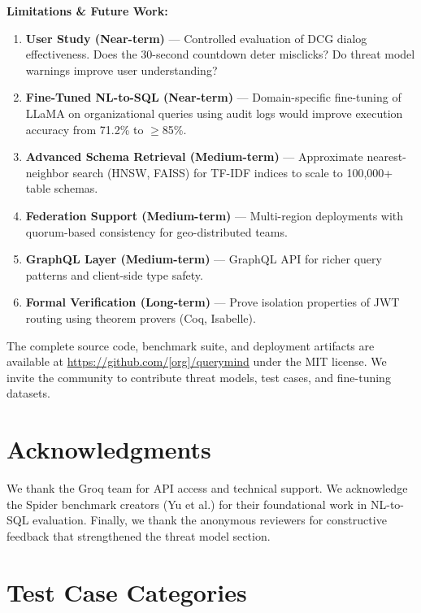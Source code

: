 \documentclass[conference]{IEEEtran}
\begin{document}
\textbf{Limitations \& Future Work:}

\begin{enumerate}
  \item \textbf{User Study (Near-term)} --- Controlled evaluation of DCG dialog effectiveness. Does the 30-second countdown deter misclicks? Do threat model warnings improve user understanding?
  
  \item \textbf{Fine-Tuned NL-to-SQL (Near-term)} --- Domain-specific fine-tuning of LLaMA on organizational queries using audit logs would improve execution accuracy from 71.2\% to $\geq$85\%.
  
  \item \textbf{Advanced Schema Retrieval (Medium-term)} --- Approximate nearest-neighbor search (HNSW, FAISS) for TF-IDF indices to scale to 100,000+ table schemas.
  
  \item \textbf{Federation Support (Medium-term)} --- Multi-region deployments with quorum-based consistency for geo-distributed teams.
  
  \item \textbf{GraphQL Layer (Medium-term)} --- GraphQL API for richer query patterns and client-side type safety.
  
  \item \textbf{Formal Verification (Long-term)} --- Prove isolation properties of JWT routing using theorem provers (Coq, Isabelle).
\end{enumerate}

The complete source code, benchmark suite, and deployment artifacts are available at \url{https://github.com/[org]/querymind} under the MIT license. We invite the community to contribute threat models, test cases, and fine-tuning datasets.

\section*{Acknowledgments}
We thank the Groq team for API access and technical support. We acknowledge the Spider benchmark creators (Yu et al.) for their foundational work in NL-to-SQL evaluation. Finally, we thank the anonymous reviewers for constructive feedback that strengthened the threat model section.

\appendix

\section{Test Case Categories}
\label{app:test_cases}
\end{document}
